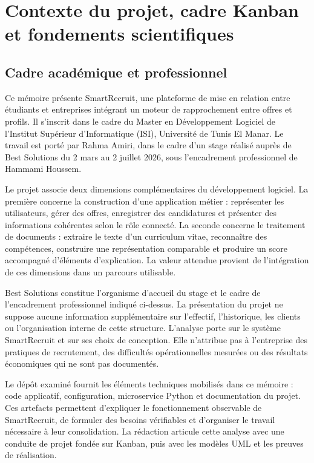 \chapter{Contexte du projet, cadre Kanban et fondements scientifiques}
\label{chap:contexte}

\section{Cadre académique et professionnel}

Ce mémoire présente SmartRecruit, une plateforme de mise en relation entre étudiants et entreprises intégrant un moteur de rapprochement entre offres et profils. Il s'inscrit dans le cadre du Master en Développement Logiciel de l'Institut Supérieur d'Informatique (ISI), Université de Tunis El Manar. Le travail est porté par Rahma Amiri, dans le cadre d'un stage réalisé auprès de Best Solutions du 2 mars au 2 juillet 2026, sous l'encadrement professionnel de Hammami Houssem.

Le projet associe deux dimensions complémentaires du développement logiciel. La première concerne la construction d'une application métier : représenter les utilisateurs, gérer des offres, enregistrer des candidatures et présenter des informations cohérentes selon le rôle connecté. La seconde concerne le traitement de documents : extraire le texte d'un curriculum vitae, reconnaître des compétences, construire une représentation comparable et produire un score accompagné d'éléments d'explication. La valeur attendue provient de l'intégration de ces dimensions dans un parcours utilisable.

Best Solutions constitue l'organisme d'accueil du stage et le cadre de l'encadrement professionnel indiqué ci-dessus. La présentation du projet ne suppose aucune information supplémentaire sur l'effectif, l'historique, les clients ou l'organisation interne de cette structure. L'analyse porte sur le système SmartRecruit et sur ses choix de conception. Elle n'attribue pas à l'entreprise des pratiques de recrutement, des difficultés opérationnelles mesurées ou des résultats économiques qui ne sont pas documentés.

Le dépôt examiné fournit les éléments techniques mobilisés dans ce mémoire : code applicatif, configuration, microservice Python et documentation du projet. Ces artefacts permettent d'expliquer le fonctionnement observable de SmartRecruit, de formuler des besoins vérifiables et d'organiser le travail nécessaire à leur consolidation. La rédaction articule cette analyse avec une conduite de projet fondée sur Kanban, puis avec les modèles UML et les preuves de réalisation.

